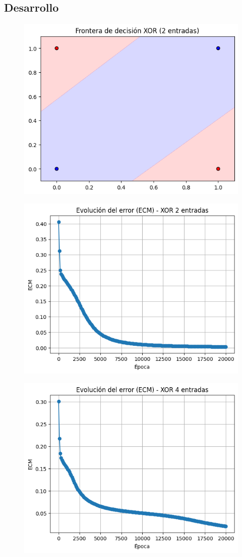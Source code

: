 \documentclass[11pt]{article} %
\begin{document}
\subsection{Desarrollo}
\begin{figure}
	\centering
	\includegraphics[width=0.7\linewidth]{imgs/ej3_frontera_xor}
	\caption{}
	\label{fig:ej3fronteraxor}
\end{figure}


\begin{figure}
	\centering
	\includegraphics[width=0.7\linewidth]{imgs/ej3__error_xor2}
	\caption{}
	\label{fig:ej3errorxor2}
\end{figure}

\begin{figure}
	\centering
	\includegraphics[width=0.7\linewidth]{imgs/ej3__error_xor4}
	\caption{}
	\label{fig:ej3errorxor4}
\end{figure}
\end{document}
